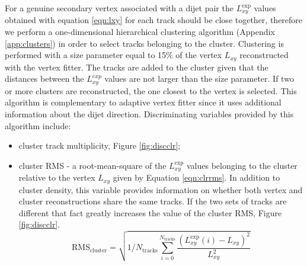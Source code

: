 \begin{enumerate}
For a genuine secondary vertex associated with a dijet pair the $L_{xy}^\text{exp}$ values obtained with equation
\ref{eqn:lxy} for each track should be close
 together, therefore we perform a one-dimensional hierarchical clustering algorithm (Appendix 
\ref{app:clusters})
in order to select tracks belonging to the cluster. 
Clustering is performed with a size parameter equal to 15\% of 
the vertex $L_{xy}$ reconstructed with the vertex fitter. 
The tracks are added to the cluster given that the distances between the $L_{xy}^{exp}$
values are not larger than the size parameter. 
 If two or more clusters 
are reconstructed, the one closest to the vertex is selected. 
This algorithm is complementary to adaptive vertex fitter
since it uses additional information about the dijet direction. Discriminating variables provided
 by this algorithm include:
\begin{itemize}
\item cluster track multiplicity, Figure \ref{fig:discclr};
\item cluster RMS - a root-mean-square of the $L_{xy}^\text{exp}$ values belonging to the cluster
 relative to the vertex $L_{xy}$ given by Equation \ref{eqn:clrrms}. In addition to cluster density, this
variable provides information on whether both vertex and cluster reconstructions share the same tracks.
 If the two sets of tracks
are different that fact greatly increases the value of the cluster RMS, Figure \ref{fig:discclr}.
\begin{equation}
\text{RMS}_\text{cluster} = \sqrt{1/N_\text{tracks}\sum_{i=0}^{N_\text{tracks}}\frac{ \left(L_{xy}^\text{exp}(i) - L_{xy}\right)^2}{L_{xy}^2}}
\label{eqn:clrrms}
\end{equation}
\end{itemize}


\end{enumerate}
